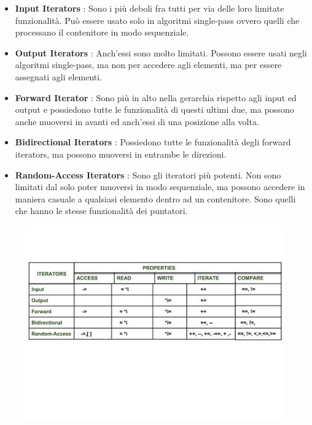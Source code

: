 \begin{itemize}
	\item \textsf{\small \textbf{Input Iterators} : Sono i più deboli fra tutti per via delle loro limitate funzionalità. Può essere usato solo in algoritmi single-pass ovvero quelli che processano il contenitore in modo sequenziale.}
	\item \textsf{\small \textbf{Output Iterators} : Anch'essi sono molto limitati. Possono essere usati negli algoritmi single-pass, ma non per accedere agli elementi, ma per essere assegnati agli elementi.}
	\item \textsf{\small \textbf{Forward Iterator} : Sono più in alto nella gerarchia rispetto agli input ed output e possiedono tutte le funzionalità di questi ultimi due, ma possono anche muoversi in avanti ed anch'essi di una posizione alla volta.}
	\item \textsf{\small \textbf{Bidirectional Iterators} : Possiedono tutte le funzionalità degli forward iterators, ma possono muoversi in entrambe le direzioni.}
	\item \textsf{\small \textbf{Random-Access Iterators} : Sono gli iteratori più potenti. Non sono limitati dal solo poter muoversi in modo sequenziale, ma possono accedere in maniera casuale a qualsiasi elemento dentro ad un contenitore. Sono quelli che hanno le stesse funzionalità dei puntatori.}
\end{itemize}

\pagebreak

\begin{figure}[H]
	\centering
	\includegraphics[width=1\textwidth, height=1\textheight, keepaspectratio]{./imgs/iterators.jpg}
	\label{fig:iterators}
\end{figure}

